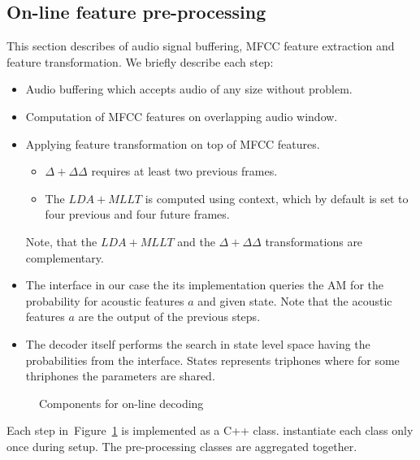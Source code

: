 \subsection{On-line feature pre-processing} 
\label{sub:preprocess}
This section describes of audio signal buffering, \ac{MFCC} feature extraction and feature transformation. 
We briefly describe each step:
\begin{itemize}
    \item Audio buffering which accepts audio of any size without problem. 
    \item Computation of \ac{MFCC} features on overlapping audio window.
    \item Applying feature transformation on top of \ac{MFCC} features. 
        \begin{itemize}
            \item $\Delta + \Delta\Delta$ requires at least two previous frames. 
            \item The $LDA+MLLT$ is computed using context,
                which by default is set to four previous and four future frames.
        \end{itemize}
        Note, that the $LDA+MLLT$ and the $\Delta+\Delta\Delta$ transformations are complementary.
    \item The  interface in our case the its  implementation
        queries the \ac{AM} for the probability for acoustic features $a$ and given state.
        Note that the acoustic features $a$ are the output of the previous steps.
    \item The decoder itself performs the search in state level space 
        having the probabilities from the  interface. 
        States represents triphones where for some thriphones the parameters are shared.
\end{itemize}

\begin{figure}[!htp]
    \begin{center}
        
        \caption{Components for on-line decoding}
    \label{fig:online_pipeline} 
    \end{center}
\end{figure}

Each step in~Figure~\ref{fig:online_pipeline} is implemented as a C++ class.
 instantiate each class only once during setup.
The pre-processing classes are aggregated together.

